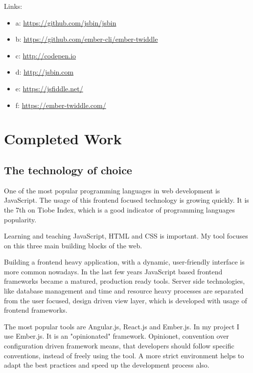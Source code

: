 \documentclass[11pt
              , a4paper
              , twoside
              , openright
              ]{report}
\begin{document}
Links:
\begin{itemize}[noitemsep]
\item a: \url{https://github.com/jsbin/jsbin} \\
\item b: \url{https://github.com/ember-cli/ember-twiddle} \\
\item c: \url{http://codepen.io} \\
\item d: \url{http://jsbin.com} \\
\item e: \url{https://jsfiddle.net/} \\
\item f: \url{https://ember-twiddle.com/} \\
\end{itemize}

\chapter{Completed Work}

\section{The technology of choice}

One of the most popular programming languages in web development is JavaScript. The usage of this frontend focused technology is growing quickly.  It is the 7th on Tiobe Index, which is a good indicator of programming languages popularity. \cite{tiobe}

Learning and teaching JavaScript, HTML and CSS is important. My tool focuses on this three main building blocks of the web.

Building a frontend heavy application, with a dynamic, user-friendly interface is more common nowadays. In the last few years JavaScript based frontend frameworks became a matured, production ready tools. Server side technologies, like database management and time and resource heavy processes are separated from the user focused, design driven view layer, which is developed with usage of frontend frameworks.

The most popular tools are Angular.js, React.js and Ember.js. In my project I use Ember.js. It is an "opinionated" framework. Opinionet, convention over configuration driven framework means, that developers should follow specific conventions, instead of freely using the tool. A more strict environment helps to adapt the best practices and speed up the development process also.
\end{document}
